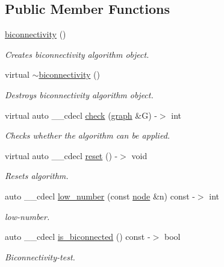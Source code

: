 \subsection*{Public Member Functions}
\begin{DoxyCompactItemize}
\item 
\mbox{\hyperlink{classbiconnectivity_aec8c11afda486322b872f468cabd1f56}{biconnectivity}} ()
\begin{DoxyCompactList}\small\item\em Creates biconnectivity algorithm object. \end{DoxyCompactList}\item 
virtual \mbox{\hyperlink{classbiconnectivity_af8e2bb061de4a08f95a2a3a94fdbd797}{$\sim$biconnectivity}} ()
\begin{DoxyCompactList}\small\item\em Destroys biconnectivity algorithm object. \end{DoxyCompactList}\item 
virtual auto \+\_\+\+\_\+cdecl \mbox{\hyperlink{classbiconnectivity_a372daa6b7897a5b284ee4695584ca81c}{check}} (\mbox{\hyperlink{classgraph}{graph}} \&G) -\/$>$ int
\begin{DoxyCompactList}\small\item\em Checks whether the algorithm can be applied. \end{DoxyCompactList}\item 
virtual auto \+\_\+\+\_\+cdecl \mbox{\hyperlink{classbiconnectivity_a16d4b175efeff663004ae4cca6faa906}{reset}} () -\/$>$ void
\begin{DoxyCompactList}\small\item\em Resets algorithm. \end{DoxyCompactList}\item 
auto \+\_\+\+\_\+cdecl \mbox{\hyperlink{classbiconnectivity_ab994e5e0460975065e1805b3e0b52d78}{low\+\_\+number}} (const \mbox{\hyperlink{classnode}{node}} \&n) const -\/$>$ int
\begin{DoxyCompactList}\small\item\em low-\/number. \end{DoxyCompactList}\item 
auto \+\_\+\+\_\+cdecl \mbox{\hyperlink{classbiconnectivity_ae4311aff180bde91f26a2f41beaabc3b}{is\+\_\+biconnected}} () const -\/$>$ bool
\begin{DoxyCompactList}\small\item\em Biconnectivity-\/test. \end{DoxyCompactList}\item 

\end{DoxyCompactItemize}

